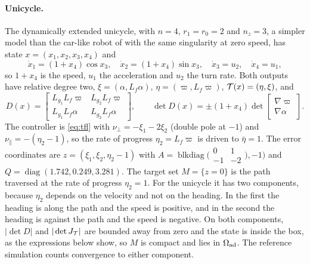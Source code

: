 \paragraph{Unicycle.} The dynamically extended unicycle, with $n=4$, $r_1=r_0=2$ and $n_z=3$, a simpler model than the car-like robot of \citet{akhtar2015} with the same singularity at zero speed, has state $x=(x_1,x_2,x_3,x_4)$ and
\begin{equation}\label{eq:uni}
\dot x_1=(1+x_4)\cos x_3,\quad \dot x_2=(1+x_4)\sin x_3,\quad \dot x_3=u_2,\quad \dot x_4=u_1,
\end{equation}
so $1+x_4$ is the speed, $u_1$ the acceleration and $u_2$ the turn rate. Both outputs have relative degree two, $\xi=(\alpha,L_f\alpha)$, $\eta=(\varpi,L_f\varpi)$, $\mathcal T(x)=(\eta,\xi)$, and
\begin{equation}
D(x)=\begin{bmatrix}L_{g_1}L_f\varpi & L_{g_2}L_f\varpi\\ L_{g_1}L_f\alpha & L_{g_2}L_f\alpha\end{bmatrix},\qquad
\det D(x)=\pm(1+x_4)\det\begin{bmatrix}\nabla\varpi\\ \nabla\alpha\end{bmatrix}.
\end{equation}
The controller is \eqref{eq:tfl} with $\nu_\perp=-\xi_1-2\xi_2$ (double pole at $-1$) and $\nu_\parallel=-(\eta_2-1)$, so the rate of progress $\eta_2=L_f\varpi$ is driven to $\bar\eta=1$. The error coordinates are $z=(\xi_1,\xi_2,\eta_2-1)$ with $A=\operatorname{blkdiag}\big(\begin{smallmatrix}0&1\\-1&-2\end{smallmatrix}\big),-1\big)$ and $Q=\operatorname{diag}(1.742,0.249,3.281)$. The target set $M=\{z=0\}$ is the path traversed at the rate of progress $\eta_2=1$. For the unicycle it has two components, because $\eta_2$ depends on the velocity and not on the heading. In the first the heading is along the path and the speed is positive, and in the second the heading is against the path and the speed is negative. On both components, $|\det D|$ and $|\det J_\mathcal T|$ are bounded away from zero and the state is inside the box, as the expressions below show, so $M$ is compact and lies in $\Omega_{\mathrm{ad}}$. The reference simulation counts convergence to either component.

